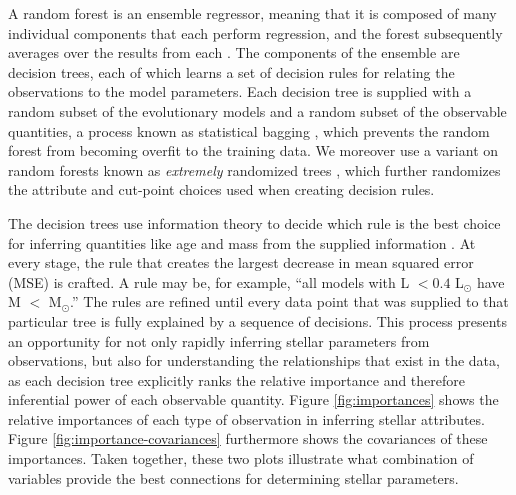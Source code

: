 \documentclass[manuscript]{aastex}
\begin{document}
A random forest is an ensemble regressor, meaning that it is composed of many individual components that each perform regression, and the forest subsequently averages over the results from each \citep{breiman2001random}. The components of the ensemble are decision trees, each of which learns a set of decision rules for relating the observations to the model parameters. Each decision tree is supplied with a random subset of the evolutionary models and a random subset of the observable quantities, a process known as statistical bagging \citep[see section 8.7 of][]{hastie2005elements}, which prevents the random forest from becoming overfit to the training data. We moreover use a variant on random forests known as \emph{extremely} randomized trees \citep{geurts2006extremely}, which further randomizes the attribute and cut-point choices used when creating decision rules. %

The decision trees use information theory to decide which rule is the best choice for inferring quantities like age and mass from the supplied information \citep[see chapter 9 of][]{hastie2005elements}. At every stage, the rule that creates the largest decrease in mean squared error (MSE) is crafted. A rule may be, for example, ``all models with L $<0.4$ L$_\odot$ have M $<$ M$_\odot$.'' %
The rules are refined until every data point that was supplied to that particular tree is fully explained by a sequence of decisions. This process presents an opportunity for not only rapidly inferring stellar parameters from observations, but also for understanding the relationships that exist in the data, as each decision tree explicitly ranks the relative importance and therefore inferential power of each observable quantity. Figure \ref{fig:importances} shows the relative importances of each type of observation in inferring stellar attributes. Figure \ref{fig:importance-covariances} furthermore shows the covariances of these importances. Taken together, these two plots illustrate what combination of variables provide the best connections for determining stellar parameters. 
\end{document}
